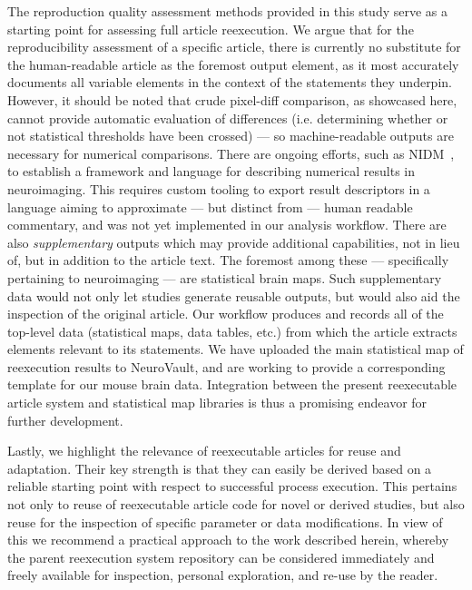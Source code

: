 The reproduction quality assessment methods provided in this study serve as a starting point for assessing full article reexecution.
We argue that for the reproducibility assessment of a specific article, there is currently no substitute for the human-readable article as the foremost output element, as it most accurately documents all variable elements in the context of the statements they underpin.
However, it should be noted that crude pixel-diff comparison, as showcased here, cannot provide automatic evaluation of differences (i.e. determining whether or not statistical thresholds have been crossed) — so machine-readable outputs are necessary for numerical comparisons.
There are ongoing efforts, such as NIDM~\cite{NIDM}, to establish a framework and language for describing numerical results in neuroimaging.
This requires custom tooling to export result descriptors in a language aiming to approximate — but distinct from — human readable commentary, and was not yet implemented in our analysis workflow.
There are also \emph{supplementary} outputs which may provide additional capabilities, not in lieu of, but in addition to the article text.
The foremost among these — specifically pertaining to neuroimaging — are statistical brain maps.
Such supplementary data would not only let studies generate reusable outputs, but would also aid the inspection of the original article.
Our workflow produces and records all of the top-level data (statistical maps, data tables, etc.) from which the article extracts elements relevant to its statements.
We have uploaded the main statistical map of reexecution results to NeuroVault, and are working to provide a corresponding template for our mouse brain data.
Integration between the present reexecutable article system and statistical map libraries is thus a promising endeavor for further development.

Lastly, we highlight the relevance of reexecutable articles for reuse and adaptation.
Their key strength is that they can easily be derived based on a reliable starting point with respect to successful process execution.
This pertains not only to reuse of reexecutable article code for novel or derived studies, but also reuse for the inspection of specific parameter or data modifications.
In view of this we recommend a practical approach to the work described herein, whereby the parent reexecution system repository can be considered immediately and freely available for inspection, personal exploration, and re-use by the reader.

